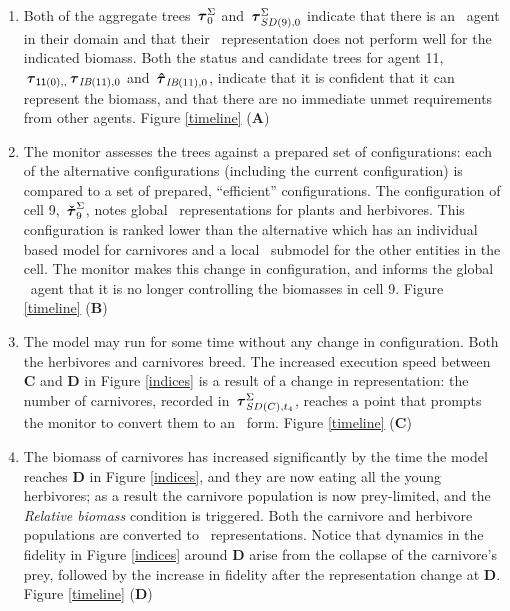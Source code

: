 \begin{enumerate}
\item %
Both of the aggregate trees $\,\boldsymbol{\tau}^\Sigma_{0}$ and $\,\boldsymbol{\tau}^\Sigma_{SD(9),0}$ indicate
that there is an \IB\ agent in their domain and that their
\SD\ rep\-re\-sen\-ta\-tion does not perform well for the indicated
biomass. Both the status and candidate trees for agent 11,
$\,\boldsymbol{\tau}_{\mathsf{11}(0),,} \,\boldsymbol{\tau}_{\emph{IB}(11),0}$ and $\,\boldsymbol{\hat{\tau}}_{\mathsf{\emph{IB}}(11),0}$, indicate
that it is confident that it can represent the biomass, and that there
are no immediate unmet requirements from other agents.  Figure 
\ref{timeline} (\textbf{A})

\item %
The monitor assesses the trees against a prepared set of
con\-fig\-ur\-a\-tions: each of the alternative con\-fig\-ur\-a\-tions (including the
current con\-fig\-ur\-a\-tion) is compared to a set of prepared, ``efficient''
con\-fig\-ur\-a\-tions.  The con\-fig\-ur\-a\-tion of cell 9, $\,\boldsymbol{\check{\tau}}^\Sigma_{9}$, notes
global \SD\ rep\-re\-sen\-ta\-tions for plants and herbivores. This
con\-fig\-ur\-a\-tion is ranked lower than the alternative which has an
in\-di\-vidu\-al based model for carnivores and a local \SD\ submodel for the
other entities in the cell.   The monitor makes this change in con\-fig\-ur\-a\-tion,
and informs the global \SD\ agent that it is no longer controlling the
biomasses in cell 9. Figure
\ref{timeline} (\textbf{B}) \label{firstconv}

\item %
\label{cv1}
The model may run for some time without any change in con\-fig\-ur\-a\-tion.
Both the herbivores and carnivores breed. The increased execution speed
between \textbf{C} and \textbf{D} in Figure \ref{indices} is a result
of a change in representation: the number of
carnivores, recorded in $\,\boldsymbol{\tau}^\Sigma_{SD(C),t_4}$, reaches a point that prompts
the monitor to convert them to an \SD\ form.
Figure \ref{timeline} (\textbf{C})

\item %
The biomass of carnivores has increased significantly by the time the
model reaches \textbf{D} in Figure \ref{indices},
and they are now eating all the young herbivores; as a result the
carnivore population is now prey-limited, and the \emph{Relative
  biomass} condition is triggered.  Both the carnivore and herbivore
populations are converted to \IB\ rep\-resentations. Notice that
dynamics in the fidelity in Figure \ref{indices} around \textbf{D}
arise from the collapse of the carnivore's prey, followed by the
increase in fidelity after the representation change at \textbf{D}.
Figure \ref{timeline} (\textbf{D})


\end{enumerate}
